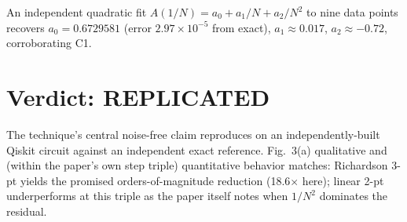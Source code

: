\documentclass[11pt]{article}
\begin{document}
An independent quadratic fit
$A(1/N) = a_0 + a_1/N + a_2/N^2$ to nine data points recovers
$a_0 = 0.6729581$ (error $2.97{\times}10^{-5}$ from exact),
$a_1 \approx 0.017$, $a_2 \approx -0.72$, corroborating C1.

\section{Verdict: REPLICATED}
The technique's central noise-free claim reproduces on an
independently-built Qiskit circuit against an independent exact
reference. Fig.~3(a) qualitative and (within the paper's own step
triple) quantitative behavior matches: Richardson 3-pt yields the
promised orders-of-magnitude reduction (18.6$\times$ here); linear 2-pt
underperforms at this triple as the paper itself notes when $1/N^2$
dominates the residual.
\end{document}
